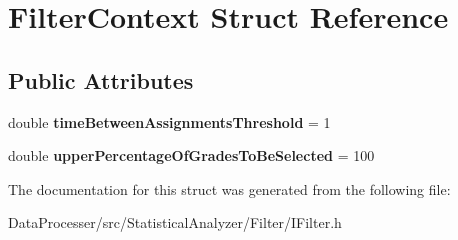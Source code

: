 \hypertarget{structFilterContext}{}\section{Filter\+Context Struct Reference}
\label{structFilterContext}
\subsection*{Public Attributes}
\begin{DoxyCompactItemize}
\item 
\mbox{\label{structFilterContext_a5028f286271d4ff440b30eb2ad7f4b66}} 
double {\bfseries time\+Between\+Assignments\+Threshold} = 1
\item 
\mbox{\label{structFilterContext_a322a08000ce440bd2df4f1623d514877}} 
double {\bfseries upper\+Percentage\+Of\+Grades\+To\+Be\+Selected} = 100
\end{DoxyCompactItemize}


The documentation for this struct was generated from the following file\+:\begin{DoxyCompactItemize}
\item 
Data\+Processer/src/\+Statistical\+Analyzer/\+Filter/I\+Filter.\+h\end{DoxyCompactItemize}
